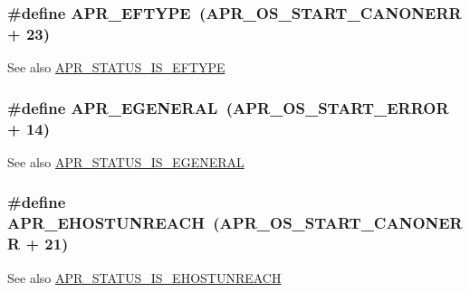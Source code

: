 \subsubsection[{\texorpdfstring{A\+P\+R\+\_\+\+E\+F\+T\+Y\+PE}{APR_EFTYPE}}]{\setlength{\rightskip}{0pt plus 5cm}\#define A\+P\+R\+\_\+\+E\+F\+T\+Y\+PE~({\bf A\+P\+R\+\_\+\+O\+S\+\_\+\+S\+T\+A\+R\+T\+\_\+\+C\+A\+N\+O\+N\+E\+RR} + 23)}\hypertarget{group__APR__Error_gac358701354d03c37e3f0de12ed6d9afc}{}\label{group__APR__Error_gac358701354d03c37e3f0de12ed6d9afc}
\begin{DoxySeeAlso}{See also}
\hyperlink{group__APR__STATUS__IS_gaf37f4f8f6c929728bf55b927576bdb69}{A\+P\+R\+\_\+\+S\+T\+A\+T\+U\+S\+\_\+\+I\+S\+\_\+\+E\+F\+T\+Y\+PE} 
\end{DoxySeeAlso}
\subsubsection[{\texorpdfstring{A\+P\+R\+\_\+\+E\+G\+E\+N\+E\+R\+AL}{APR_EGENERAL}}]{\setlength{\rightskip}{0pt plus 5cm}\#define A\+P\+R\+\_\+\+E\+G\+E\+N\+E\+R\+AL~({\bf A\+P\+R\+\_\+\+O\+S\+\_\+\+S\+T\+A\+R\+T\+\_\+\+E\+R\+R\+OR} + 14)}\hypertarget{group__APR__Error_ga18f5678bea0c2c704a2b6a186c9e158b}{}\label{group__APR__Error_ga18f5678bea0c2c704a2b6a186c9e158b}
\begin{DoxySeeAlso}{See also}
\hyperlink{group__APR__STATUS__IS_gab015701a084807912b3c0464c6badf1a}{A\+P\+R\+\_\+\+S\+T\+A\+T\+U\+S\+\_\+\+I\+S\+\_\+\+E\+G\+E\+N\+E\+R\+AL} 
\end{DoxySeeAlso}
\subsubsection[{\texorpdfstring{A\+P\+R\+\_\+\+E\+H\+O\+S\+T\+U\+N\+R\+E\+A\+CH}{APR_EHOSTUNREACH}}]{\setlength{\rightskip}{0pt plus 5cm}\#define A\+P\+R\+\_\+\+E\+H\+O\+S\+T\+U\+N\+R\+E\+A\+CH~({\bf A\+P\+R\+\_\+\+O\+S\+\_\+\+S\+T\+A\+R\+T\+\_\+\+C\+A\+N\+O\+N\+E\+RR} + 21)}\hypertarget{group__APR__Error_ga489b0c02fa7cf33ed6d698d385661f86}{}\label{group__APR__Error_ga489b0c02fa7cf33ed6d698d385661f86}
\begin{DoxySeeAlso}{See also}
\hyperlink{group__APR__STATUS__IS_gad9307ff02e50296c528b79a670dc80bb}{A\+P\+R\+\_\+\+S\+T\+A\+T\+U\+S\+\_\+\+I\+S\+\_\+\+E\+H\+O\+S\+T\+U\+N\+R\+E\+A\+CH} 
\end{DoxySeeAlso}
